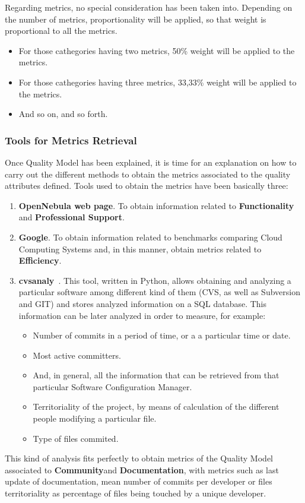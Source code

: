 \documentclass[11pt]{article}
\begin{document}
Regarding metrics, no special consideration has been taken into. Depending on the number of metrics, proportionality will be applied, so that weight is proportional to all the metrics. 
\begin{itemize}\itemsep0pt
\item{For those cathegories having two metrics, 50\% weight will be applied to the metrics.}
\item{For those cathegories having three metrics, 33,33\% weight will be applied to the metrics.}
\item{And so on, and so forth.}
\end{itemize}

\subsubsection{Tools for Metrics Retrieval}

Once Quality Model has been explained, it is time for an explanation on how to carry out the different methods to obtain the metrics associated to the quality attributes defined. Tools used to obtain the metrics have been basically three:
\begin{enumerate}\itemsep0pt
\item{\textbf{OpenNebula web page}}. To obtain information related to \textbf{Functionality} and \textbf{Professional Support}.
\item{\textbf{Google}}. To obtain information related to benchmarks comparing Cloud Computing Systems and, in this manner, obtain metrics related to \textbf{Efficiency}.
\item{\textbf{cvsanaly}}~\cite{CVSANALY00}. This tool, written in Python, allows obtaining and analyzing a particular software among different kind of them (CVS, as well as Subversion and GIT) and stores analyzed information on a SQL database. This information can be later analyzed in order to measure, for example:
\begin{itemize}\itemsep0pt
\item{Number of commits in a period of time, or a a particular time or date}.
\item{Most active committers}.
\item{And, in general, all the information that can be retrieved from that particular Software Configuration Manager}.
\item{Territoriality of the project, by means of calculation of the different people modifying a particular file}.
\item{Type of files commited}.
\end{itemize}
\end{enumerate}
This kind of analysis fits perfectly to obtain metrics of the Quality Model associated to \textbf{Community}and \textbf{Documentation}, with metrics such as last update of documentation, mean number of commits per developer or files territoriality as percentage of files being touched by a unique developer.
\end{document}
